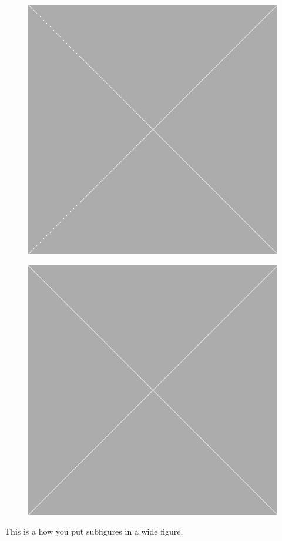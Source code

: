 \documentclass[10pt,oneside]{book}
\begin{document}
\begin{widefigure}
    \centering
    \begin{subfigure}[b]{0.45\linewidth}
      \includegraphics[width=\linewidth]{Pictures/placeholder.jpg}
    \end{subfigure}
    \qquad
    \begin{subfigure}[b]{0.45\linewidth}
      \includegraphics[width=\linewidth]{Pictures/placeholder.jpg}
    \end{subfigure}
  \caption{This is a how you put subfigures in a wide figure.}
\end{widefigure}
\end{document}

